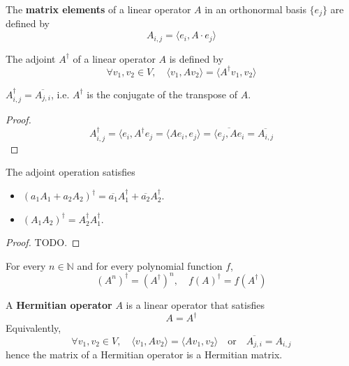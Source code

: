 \begin{definition}
	The \textbf{matrix elements} of a linear operator $A$ in an orthonormal basis $\{ e_j \}$ are defined by
	\[
		A_{i, j} = \langle e_i, A \cdot e_j \rangle
	\]
\end{definition}

\begin{definition}
	The adjoint $A^{\dagger}$ of a linear operator $A$ is defined by
	\[
		\forall v_1, v_2 \in V, \quad \langle v_1, A v_2 \rangle = \langle A^{\dagger} v_1, v_2 \rangle
	\]
\end{definition}

\begin{proposition}
	$A^{\dagger}_{i, j} = \overline{A_{j, i}}$, i.e. $A^{\dagger}$ is the conjugate of the transpose of $A$.
\end{proposition}

\begin{proof}
	\[
		A^{\dagger}_{i, j} = \langle e_i, A^{\dagger} e_j = \langle A e_i, e_j \rangle = \overline{\langle e_j, A e_i} = \overline{A_{i, j}}
	\]
\end{proof}

\begin{proposition}
	The adjoint operation satisfies
	\begin{itemize}
		\item ${(a_1 A_1 + a_2 A_2)}^{\dagger} = \overline{a_1} A_1^{\dagger} + \overline{a_2} A_2^{\dagger}$.
		\item ${(A_1 A_2)}^{\dagger} = A_2^{\dagger} A_1^{\dagger}$.
	\end{itemize}
\end{proposition}

\begin{proof}
	TODO.
\end{proof}

\begin{corollary}
	For every $n \in \mathbb{N}$ and for every polynomial function $f$,
	\[
		{(A^n)}^{\dagger} = {(A^{\dagger})}^n, \quad {f(A)}^{\dagger} = f(A^{\dagger})
	\]
\end{corollary}

\begin{definition}
	A \textbf{Hermitian operator} $A$ is a linear operator that satisfies
	\[
		A = A^{\dagger}
	\]
	Equivalently,
	\[
		\forall v_1, v_2 \in V, \quad \langle v_1, A v_2 \rangle = \langle A v_1, v_2 \rangle \quad \text{or} \quad \overline{A_{j, i}} = A_{i, j}
	\]
	hence the matrix of a Hermitian operator is a Hermitian matrix.
\end{definition}

